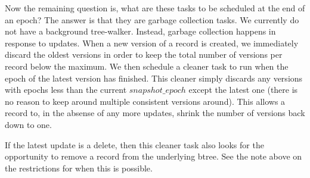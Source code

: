 \documentclass[10pt]{article}
\begin{document}
Now the remaining question is, what are these tasks to be scheduled at the end
of an epoch? The answer is that they are garbage collection tasks.  We
currently do not have a background tree-walker. Instead, garbage collection
happens in response to updates. When a new version of a record is created, we
immediately discard the oldest versions in order to keep the total number of
versions per record below the maximum. We then schedule a cleaner task to run
when the epoch of the latest version has finished. This cleaner simply discards
any versions with epochs less than the current $snapshot\_epoch$ except the
latest one (there is no reason to keep around multiple consistent versions
around).  This allows a record to, in the absense of any more updates, shrink
the number of versions back down to one. 

If the latest update is a delete, then this cleaner task also looks for the
opportunity to remove a record from the underlying btree. See the note above on
the restrictions for when this is possible.
\end{document}
